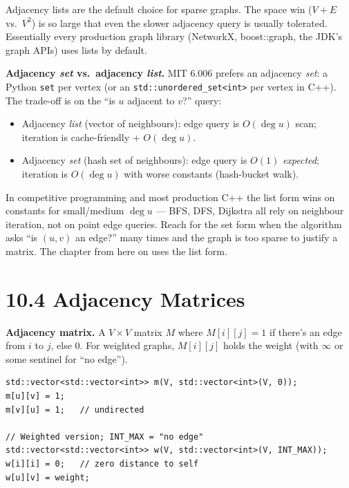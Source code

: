 \documentclass[11pt]{article}
\begin{document}
\begin{ideabox}
Adjacency lists are the default choice for sparse graphs. The space win ($V + E$ vs.\ $V^2$) is so large that even the slower adjacency query is usually tolerated. Essentially every production graph library (NetworkX, boost::graph, the JDK's graph APIs) uses lists by default.
\end{ideabox}

\begin{notebox}
\textbf{Adjacency \emph{set} vs.\ adjacency \emph{list}.} MIT 6.006
prefers an adjacency \emph{set}: a Python \texttt{set} per vertex
(or an \texttt{std::unordered\_set<int>} per vertex in C++). The
trade-off is on the ``is $u$ adjacent to $v$?'' query:

\begin{itemize}[leftmargin=*]
    \item Adjacency \emph{list} (vector of neighbours): edge query
          is $O(\deg u)$ scan; iteration is cache-friendly +
          $O(\deg u)$.
    \item Adjacency \emph{set} (hash set of neighbours): edge query
          is $O(1)$ \emph{expected}; iteration is $O(\deg u)$ with
          worse constants (hash-bucket walk).
\end{itemize}

In competitive programming and most production C++ the list form
wins on constants for small/medium $\deg u$ --- BFS, DFS, Dijkstra
all rely on neighbour iteration, not on point edge queries. Reach
for the set form when the algorithm asks ``is $(u,v)$ an edge?''
many times and the graph is too sparse to justify a matrix. The
chapter from here on uses the list form.
\end{notebox}

\section{10.4 Adjacency Matrices}

\begin{defnbox}
\textbf{Adjacency matrix.} A $V \times V$ matrix $M$ where $M[i][j] = 1$ if there's an edge from $i$ to $j$, else $0$. For weighted graphs, $M[i][j]$ holds the weight (with $\infty$ or some sentinel for ``no edge'').
\end{defnbox}

\begin{lstlisting}[basicstyle=\ttfamily\small,frame=single]
std::vector<std::vector<int>> m(V, std::vector<int>(V, 0));
m[u][v] = 1;
m[v][u] = 1;   // undirected

// Weighted version; INT_MAX = "no edge"
std::vector<std::vector<int>> w(V, std::vector<int>(V, INT_MAX));
w[i][i] = 0;   // zero distance to self
w[u][v] = weight;
\end{lstlisting}
\end{document}
